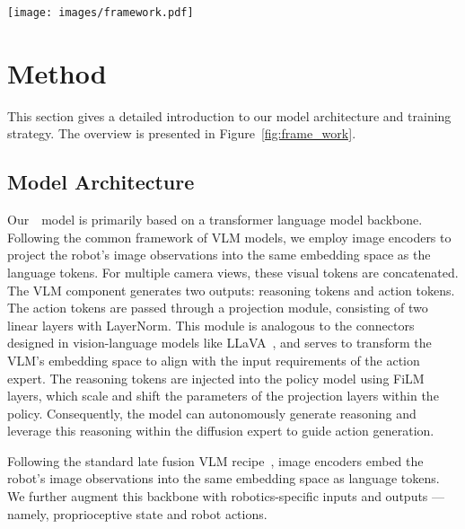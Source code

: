 \begin{figure*}[t]
    \centering
    \texttt{[image: images/framework.pdf]}
    \caption{\textbf{DexVLA architecture and embodied curriculum learning.} Our model employs a three-stage training process. \textbf{Stage 1 (left)} trains the Diffusion Expert independently, without the VLM. \textbf{Stages 2 and 3 (middle)} integrate the Diffusion Expert with a VLM, discarding the visual and language components within the expert. \textbf{The Diffusion Expert (right)} uses multiple heads for cross-embodiment learning.}\label{fig:frame_work}
    \vspace*{-10pt}
\end{figure*}



\section{Method}
This section gives a detailed introduction to our model architecture and training strategy. The overview is presented in Figure~\ref{fig:frame_work}.
\subsection{Model Architecture}
Our~\methodname~model is primarily based on a transformer language model backbone. Following the common framework of VLM models, we employ image encoders to project the robot's image observations into the same embedding space as the language tokens. For multiple camera views, these visual tokens are concatenated. The VLM component generates two outputs: reasoning tokens and action tokens. The action tokens are passed through a projection module, consisting of two linear layers with LayerNorm. This module is analogous to the connectors designed in vision-language models like LLaVA~\cite{liu2024visual}, and serves to transform the VLM's embedding space to align with the input requirements of the action expert. The reasoning tokens are injected into the policy model using FiLM layers, which scale and shift the parameters of the projection layers within the policy. Consequently, the model can autonomously generate reasoning and leverage this reasoning within the diffusion expert to guide action generation.

Following the
standard late fusion VLM recipe~\cite{liu2024improved, liu2024visual}, image encoders
embed the robot’s image observations into the same embedding space as language tokens. We further augment this
backbone with robotics-specific inputs and outputs — namely,
proprioceptive state and robot actions.

